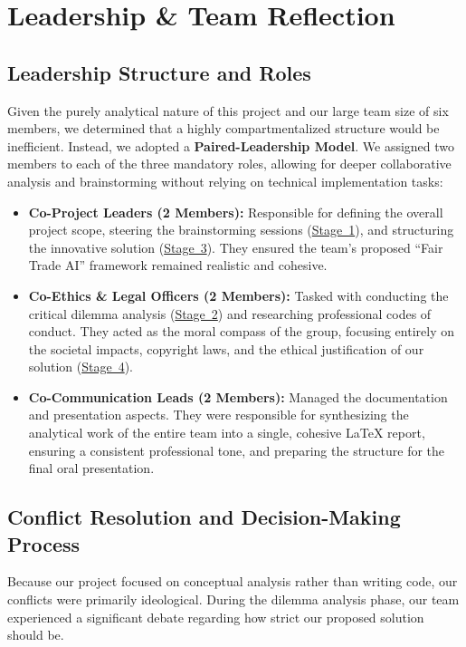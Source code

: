 \section{Leadership \& Team Reflection}\label{sec:team-reflection}

\subsection{Leadership Structure and Roles}\label{sec:roles}
Given the purely analytical nature of this project and our large team size of six members, we determined that a highly compartmentalized structure would be inefficient. Instead, we adopted a \textbf{Paired-Leadership Model}. We assigned two members to each of the three mandatory roles, allowing for deeper collaborative analysis and brainstorming without relying on technical implementation tasks:
\begin{itemize}
    \item \textbf{Co-Project Leaders (2 Members):} Responsible for defining the overall project scope, steering the brainstorming sessions (\hyperref[sec:brainstorming]{Stage~1}), and structuring the innovative solution (\hyperref[sec:solution-design]{Stage~3}). They ensured the team's proposed ``Fair Trade AI'' framework remained realistic and cohesive.
    \item \textbf{Co-Ethics \& Legal Officers (2 Members):} Tasked with conducting the critical dilemma analysis (\hyperref[sec:critical-analysis]{Stage~2}) and researching professional codes of conduct. They acted as the moral compass of the group, focusing entirely on the societal impacts, copyright laws, and the ethical justification of our solution (\hyperref[sec:ethics-legal]{Stage~4}).
    \item \textbf{Co-Communication Leads (2 Members):} Managed the documentation and presentation aspects. They were responsible for synthesizing the analytical work of the entire team into a single, cohesive LaTeX report, ensuring a consistent professional tone, and preparing the structure for the final oral presentation.
\end{itemize}

\subsection{Conflict Resolution and Decision-Making Process}\label{sec:conflict-resolution}
Because our project focused on conceptual analysis rather than writing code, our conflicts were primarily ideological. During the dilemma analysis phase, our team experienced a significant debate regarding how strict our proposed solution should be.

